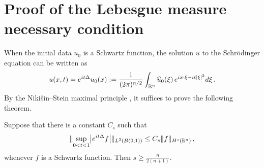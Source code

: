 \documentclass[biblatex]{pzorin-note}
\begin{document}
\section{Proof of the Lebesgue measure necessary condition}

When the initial data $u_{0}$ is a Schwartz function, the solution $u$ to the Schr\"odinger equation can be written as
\begin{equation*}
u(x, t) = e^{i t \Delta}u_{0}(x):=\frac{1}{(2\pi)^{n/2}}\int_{\R^n}\widehat{u}_{0}(\xi)\, e^{ix\cdot\xi -it \abs{ \xi }^{2}} d \xi \, .
\end{equation*}
By the Niki\v sin--Stein maximal
principle \cite{N, st}, it suffices to prove the following theorem.

\begin{theorem}\label{max2}
Suppose that there is a constant $C_s$ such that
\begin{equation*}
\norm{ \sup_{0< t < 1} \abs[\big]{ e^{it\Delta} f } }_{L^{2}(B(0,1))} \le C_s\norm{ f }_{H^{s}(\R^n)} \, ,
\end{equation*}
whenever $f$ is a Schwartz function. Then $s\ge\frac{n}{2(n+1)}$.
\end{theorem}
\end{document}
